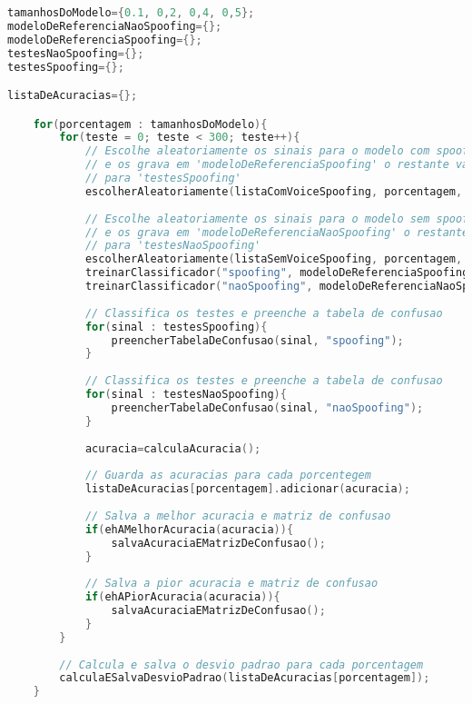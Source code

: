 \begin{lstlisting}[language=C++, caption={Algoritmo que caracteriza o procedimento 03}, label={lst:experiment03Algo}]
tamanhosDoModelo={0.1, 0,2, 0,4, 0,5};
modeloDeReferenciaNaoSpoofing={};
modeloDeReferenciaSpoofing={};
testesNaoSpoofing={};
testesSpoofing={};

listaDeAcuracias={};

	for(porcentagem : tamanhosDoModelo){
		for(teste = 0; teste < 300; teste++){
			// Escolhe aleatoriamente os sinais para o modelo com spoofing 
			// e os grava em 'modeloDeReferenciaSpoofing' o restante vai 
			// para 'testesSpoofing'
			escolherAleatoriamente(listaComVoiceSpoofing, porcentagem, modeloDeReferenciaSpoofing, testesSpoofing);
			
			// Escolhe aleatoriamente os sinais para o modelo sem spoofing
			// e os grava em 'modeloDeReferenciaNaoSpoofing' o restante vai 
			// para 'testesNaoSpoofing'
			escolherAleatoriamente(listaSemVoiceSpoofing, porcentagem, modeloDeReferenciaNaoSpoofing, testesNaoSpoofing);
			treinarClassificador("spoofing", modeloDeReferenciaSpoofing);
			treinarClassificador("naoSpoofing", modeloDeReferenciaNaoSpoofing);
			
			// Classifica os testes e preenche a tabela de confusao
			for(sinal : testesSpoofing){
				preencherTabelaDeConfusao(sinal, "spoofing");
			} 
			
			// Classifica os testes e preenche a tabela de confusao
			for(sinal : testesNaoSpoofing){
				preencherTabelaDeConfusao(sinal, "naoSpoofing");
			}
			
			acuracia=calculaAcuracia();
			
			// Guarda as acuracias para cada porcentegem
			listaDeAcuracias[porcentagem].adicionar(acuracia);
			
			// Salva a melhor acuracia e matriz de confusao
			if(ehAMelhorAcuracia(acuracia)){
				salvaAcuraciaEMatrizDeConfusao();
			}
			
			// Salva a pior acuracia e matriz de confusao
			if(ehAPiorAcuracia(acuracia)){
				salvaAcuraciaEMatrizDeConfusao();
			}
		}
		
		// Calcula e salva o desvio padrao para cada porcentagem
		calculaESalvaDesvioPadrao(listaDeAcuracias[porcentagem]);
	}			
\end{lstlisting}